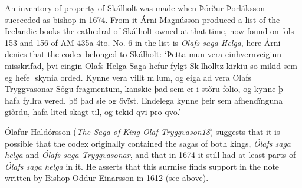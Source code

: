 \documentclass[11pt,twoside]{article}\makeatletter
\begin{document}
An inventory of property of Skálholt was made when  {\name Þórður Þorláksson} succeeded as bishop in 1674. From it Árni Magnússon produced a list of the Icelandic books the cathedral of Skálholt owned at that time, now found on fols 153 and 156 of AM 435a 4to. No. 6 in the list is \textit{Olafs saga Helga}, here Árni denies that the codex belonged to Skálholt: ‘Þetta mun vera einhvernveiginn mis{\hskip1pt}\newline skrifad, þvi eingin Olafs Helga Saga {\hskip1pt}\newline  hefur fylgt Sklholltz kirkiu so mikid  sem eg hefe skynia orded. Kynne {\hskip1pt}\newline  vera villt mlum, og eiga ad vera {\hskip1pt}\newline  Olafs Tryggvasonar Sỏgu frag{\hskip1pt}\newline mentum, kanskie þad sem er i {\hskip1pt}\newline  stőru folio, og kynne þ hafa fyll{\hskip1pt}\newline ra vered, þő þad sie og ővïst. {\hskip1pt}\newline  Endelega kynne þeir sem afhend{\hskip1pt}\newline ïnguna giỏrdu, hafa lited skagt til, {\hskip1pt}\newline  og tekid qvi pro qvo.’ \par
Ólafur Haldórsson (\textit{The Saga of King Olaf Tryggvason18}) suggests that it is possible that the codex originally contained the sagas of both kings, \textit{Ólafs saga helga} and \textit{Ólafs saga Tryggvasonar}, and that in 1674 it still had at least parts of \textit{Ólafs saga helga} in it. He asserts that this surmise finds support in the note written by Bishop  {\name Oddur Einarsson} in 1612 (see above).
\end{document}

